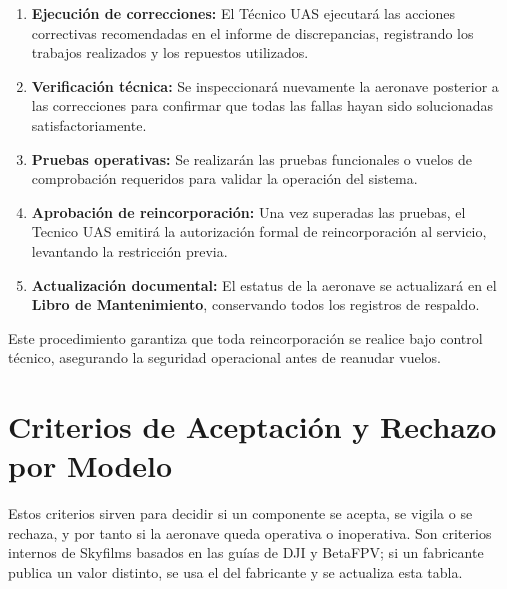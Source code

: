 \begin{enumerate}
    \item \textbf{Ejecución de correcciones:} El Técnico UAS ejecutará las acciones correctivas recomendadas en el informe de discrepancias, registrando los trabajos realizados y los repuestos utilizados.

    \item \textbf{Verificación técnica:} Se inspeccionará nuevamente la aeronave posterior a las correcciones para confirmar que todas las fallas hayan sido solucionadas satisfactoriamente.

    \item \textbf{Pruebas operativas:} Se realizarán las pruebas funcionales o vuelos de comprobación requeridos para validar la operación del sistema.

    \item \textbf{Aprobación de reincorporación:} Una vez superadas las pruebas, el Tecnico UAS emitirá la autorización formal de reincorporación al servicio, levantando la restricción previa.

    \item \textbf{Actualización documental:} El estatus de la aeronave se actualizará en el \textbf{Libro de Mantenimiento}, conservando todos los registros de respaldo.
\end{enumerate}

Este procedimiento garantiza que toda reincorporación se realice bajo control técnico, asegurando la seguridad operacional antes de reanudar vuelos.

\section{Criterios de Aceptación y Rechazo por Modelo}
Estos criterios sirven para decidir si un componente se acepta, se vigila o se rechaza, y por tanto si la aeronave queda operativa o inoperativa. Son criterios internos de Skyfilms basados en las guías de DJI y BetaFPV; si un fabricante publica un valor distinto, se usa el del fabricante y se actualiza esta tabla.

